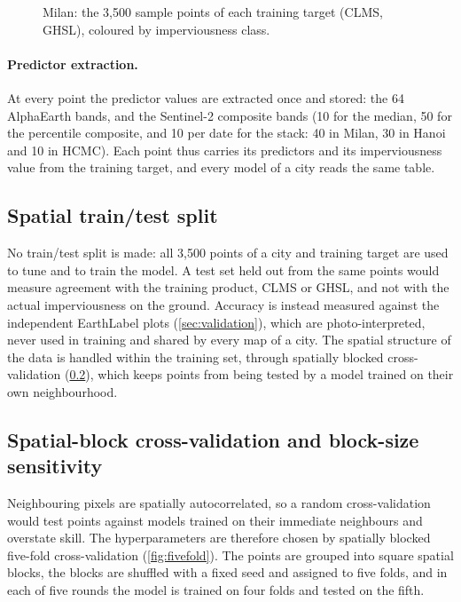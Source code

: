 \begin{figure}[htbp]
  \centering
  \caption{Milan: the 3{,}500 sample points of each training target (CLMS,
  GHSL), coloured by imperviousness class.}
  \label{fig:points}
\end{figure}

\paragraph{Predictor extraction.} At every point the predictor values are
extracted once and stored: the 64 AlphaEarth bands, and the Sentinel-2
composite bands (10 for the median, 50 for the percentile composite, and 10
per date for the stack: 40 in Milan, 30 in Hanoi and 10 in HCMC). Each point
thus carries its predictors and its imperviousness value from the training
target, and every model of a city reads the same table.

\subsection{Spatial train/test split}
\label{sec:split}

No train/test split is made: all 3{,}500 points of a city and training
target are used to tune and to train the model. A test set held out from the
same points would measure agreement with the training product, CLMS or GHSL,
and not with the actual imperviousness on the ground. Accuracy is instead
measured against the independent EarthLabel plots (\cref{sec:validation}),
which are photo-interpreted, never used in training and shared by every map
of a city. The spatial structure of the data is handled within the training
set, through spatially blocked cross-validation (\cref{sec:cv}), which keeps
points from being tested by a model trained on their own neighbourhood.

\subsection{Spatial-block cross-validation and block-size sensitivity}
\label{sec:cv}

Neighbouring pixels are spatially autocorrelated, so a random
cross-validation would test points against models trained on their
immediate neighbours and overstate skill. The hyperparameters are therefore
chosen by spatially blocked five-fold cross-validation
(\cref{fig:fivefold}). The points are grouped into square spatial blocks,
the blocks are shuffled with a fixed seed and assigned to five folds, and in
each of five rounds the model is trained on four folds and tested on the
fifth.

